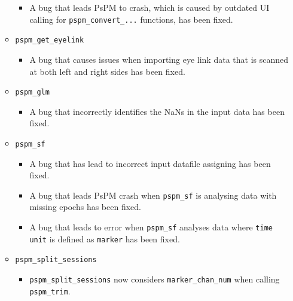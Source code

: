 \documentclass[english]{article}
\numberwithin{equation}{section}
\numberwithin{figure}{section}
\begin{document}
\begin{itemize}
\begin{itemize}
\begin{itemize}
			\item A bug that leads PsPM to crash, which is caused by outdated UI calling for \texttt{pspm\_convert\_...} functions, has been fixed.
		\end{itemize}
		\item \texttt{pspm\_get\_eyelink}
		\begin{itemize}
			\item A bug that causes issues when importing eye link data that is scanned at both left and right sides has been fixed.
		\end{itemize}
		\item \texttt{pspm\_glm}
		\begin{itemize}
			\item A bug that incorrectly identifies the NaNs in the input data has been fixed.
		\end{itemize}
		\item \texttt{pspm\_sf}
		\begin{itemize}
			\item A bug that has lead to incorrect input datafile assigning has been fixed.
			\item A bug that leads PsPM crash when \texttt{pspm\_sf} is analysing data with missing epochs has been fixed.
			\item A bug that leads to error when \texttt{pspm\_sf} analyses data where \texttt{time unit} is defined as \texttt{marker} has been fixed.
		\end{itemize}
		\item \texttt{pspm\_split\_sessions}
		\begin{itemize}
			\item \texttt{pspm\_split\_sessions} now considers \texttt{marker\_chan\_num} when calling \texttt{pspm\_trim}.
		\end{itemize}
	\end{itemize}
	

\end{itemize}
\end{document}

